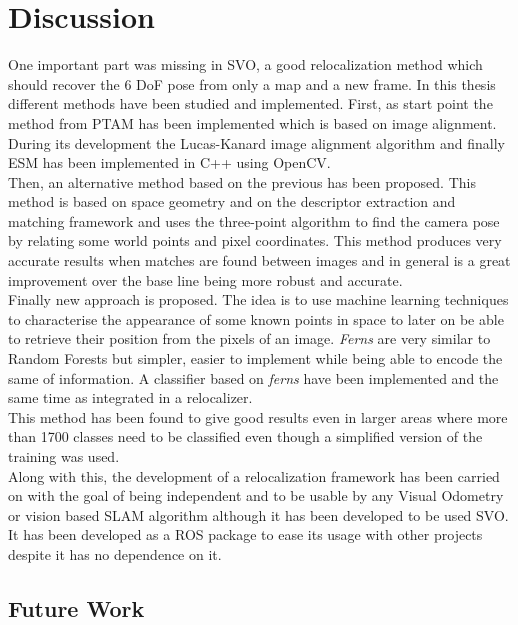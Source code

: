 \chapter{Discussion}\label{sec:discussion}

One important part was missing in SVO, a good relocalization method which should recover the 6 DoF pose from only a map and a new frame. In this thesis different methods have been studied and implemented. First, as start point the method from PTAM has been implemented which is based on image alignment. During its development the Lucas-Kanard image alignment algorithm  and finally ESM has been implemented in C++ using OpenCV.\\

Then, an alternative method based on the previous has been proposed. This method is based on space geometry and on the descriptor extraction and matching framework and uses the three-point algorithm to find the camera pose by relating some world points and pixel coordinates. This method produces very accurate results when matches are found between images and in general is a great improvement over the base line being more robust and accurate.\\


Finally new approach is proposed. The idea is to use machine learning techniques to characterise the appearance of some known points in space to later on be able to retrieve their position from the pixels of an image. \textit{Ferns} are very similar to Random Forests but simpler, easier to implement while being able to encode the same of information. A classifier based on \textit{ferns} have been implemented and the same time as integrated in a relocalizer.\\

This method has been found to give good results even in larger areas where more than 1700 classes need to be classified even though a simplified version of the training was used.\\

Along with this, the development of a relocalization framework has been carried on with the goal of being independent and to be usable by any Visual Odometry or vision based SLAM algorithm although it has been developed to be used SVO. It has been developed as a ROS package to ease its usage with other projects despite it has no dependence on it.\\


\section{Future Work}\label{sec:future_work}


